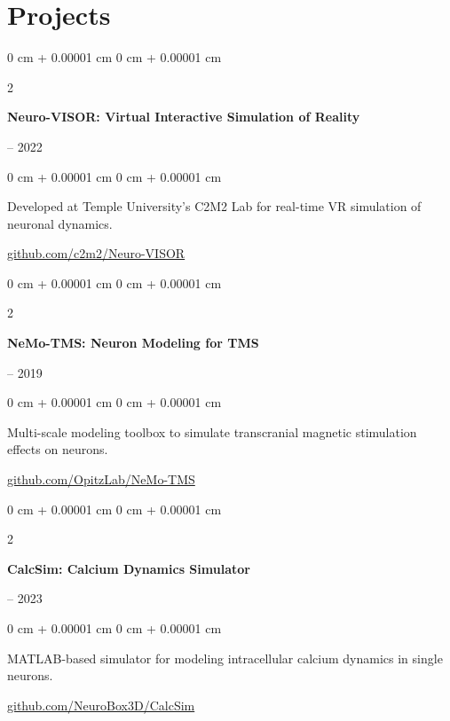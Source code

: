 \documentclass[10pt, letterpaper]{article}
\newenvironment{onecolentry}{
    \begin{adjustwidth}{
        0 cm + 0.00001 cm
    }{
        0 cm + 0.00001 cm
    }
}{
    \end{adjustwidth}
} %
\newenvironment{twocolentry}[2][]{
    \onecolentry
    \def\secondColumn{#2}
    \setcolumnwidth{\fill, 4.5 cm}
    \begin{paracol}{2}
}{
    \switchcolumn \raggedleft \secondColumn
    \end{paracol}
    \endonecolentry
} %
\begin{document}
    
   \section{Projects}

\begin{samepage}
    \begin{twocolentry}{
        2018 – 2022
    }
        \textbf{Neuro-VISOR: Virtual Interactive Simulation of Reality}
    \end{twocolentry}

    \vspace{0.10 cm}
    
    \begin{onecolentry}
        Developed at Temple University's C2M2 Lab for real-time VR simulation of neuronal dynamics.
        \vspace{0.10 cm}

        \href{https://github.com/c2m2/Neuro-VISOR}{github.com/c2m2/Neuro-VISOR}
    \end{onecolentry}
\end{samepage}

\vspace{0.3 cm}

\begin{samepage}
    \begin{twocolentry}{
        2018 – 2019
    }
        \textbf{NeMo-TMS: Neuron Modeling for TMS}
    \end{twocolentry}

    \vspace{0.10 cm}
    
    \begin{onecolentry}
        Multi-scale modeling toolbox to simulate transcranial magnetic stimulation effects on neurons.

        \vspace{0.10 cm}
        
        \href{https://github.com/OpitzLab/NeMo-TMS}{github.com/OpitzLab/NeMo-TMS}
    \end{onecolentry}
\end{samepage}

\vspace{0.3 cm}

\begin{samepage}
    \begin{twocolentry}{
        2021 – 2023
    }
        \textbf{CalcSim: Calcium Dynamics Simulator}
    \end{twocolentry}

    \vspace{0.10 cm}
    
    \begin{onecolentry}
        MATLAB-based simulator for modeling intracellular calcium dynamics in single neurons.

        \vspace{0.10 cm}
        
        \href{https://github.com/NeuroBox3D/CalcSim}{github.com/NeuroBox3D/CalcSim}
    \end{onecolentry}
\end{samepage}
\end{document}

